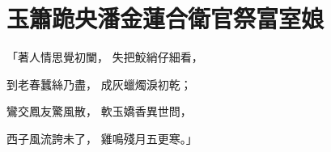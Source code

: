 %

\chapter{玉簫跪央潘金蓮\KG 合衛官祭富室娘}


\begin{showcontents}{}



「著人情思覺初闌，  失把鮫綃仔細看，

到老春蠶絲乃盡，  成灰蠟燭淚初乾；

鸞交鳳友驚風散，  軟玉嬌香異世問，

西子風流誇未了，  雞鳴殘月五更寒。」


\end{showcontents}
